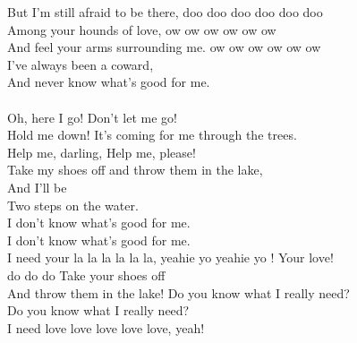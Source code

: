   But I'm still afraid to be there,
  doo doo doo doo doo doo\\
  Among your hounds of love,
  ow ow ow ow ow ow\\
  And feel your arms surrounding me.
  ow ow ow ow ow ow\\
  I've always been a coward,\\
  And never know what's good for me.\\
  \\
  Oh, here I go!
  Don't let me go!\\
  Hold me down!
  It's coming for me through the trees.\\
  Help me, darling,
  Help me, please!\\
  Take my shoes off
  and throw them in the lake,\\
  And I'll be\\
  Two steps on the water. \\
  I don't know what's good for me.\\
  I don't know what's good for me.\\
  I need your la la la la la la, yeahie yo yeahie yo !
  Your love!\\
  do do do
  Take your shoes off\\
  And throw them in the lake!
  Do you know what I really need?\\
  Do you know what I really need?\\
  I need love love love love love, yeah!\\
